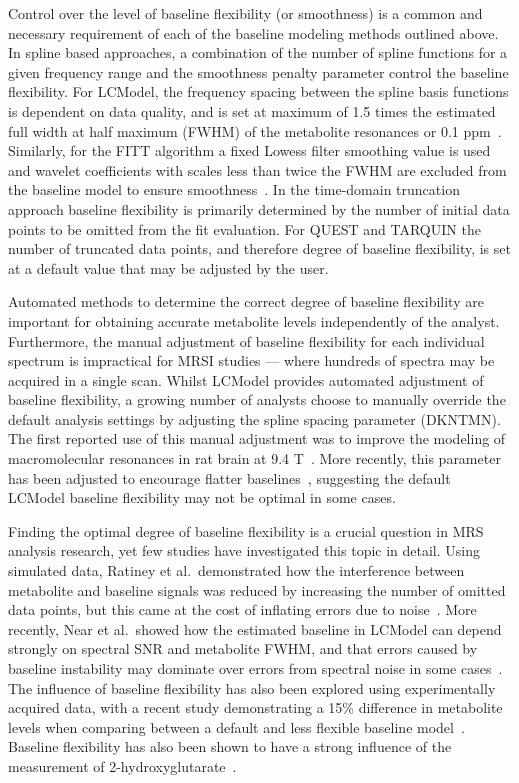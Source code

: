 \documentclass[num-refs]{wiley-article}
\begin{document}
Control over the level of baseline flexibility (or smoothness) is a common and necessary requirement of each of the baseline modeling methods outlined above. In spline based approaches, a combination of the number of spline functions for a given frequency range and the smoothness penalty parameter control the baseline flexibility. For LCModel, the frequency spacing between the spline basis functions is dependent on data quality, and is set at maximum of 1.5 times the estimated full width at half maximum (FWHM) of the metabolite resonances or 0.1 ppm~\cite{Provencher1993}. Similarly, for the FITT algorithm a fixed Lowess filter smoothing value is used and wavelet coefficients with scales less than twice the FWHM are excluded from the baseline model to ensure smoothness~\cite{Young1998}. In the time-domain truncation approach baseline flexibility is primarily determined by the number of initial data points to be omitted from the fit evaluation. For QUEST and TARQUIN the number of truncated data points, and therefore degree of baseline flexibility, is set at a default value that may be adjusted by the user.

Automated methods to determine the correct degree of baseline flexibility are important for obtaining accurate metabolite levels independently of the analyst. Furthermore, the manual adjustment of baseline flexibility for each individual spectrum is impractical for MRSI studies --- where hundreds of spectra may be acquired in a single scan. Whilst LCModel provides automated adjustment of baseline flexibility, a growing number of analysts choose to manually override the default analysis settings by adjusting the spline spacing parameter (DKNTMN). The first reported use of this manual adjustment was to improve the modeling of macromolecular resonances in rat brain at 9.4 T~\cite{Pfeuffer1999}. More recently, this parameter has been adjusted to encourage flatter baselines~\cite{Deelchand2016,Terpstra2010,Marjanska2018}, suggesting the default LCModel baseline flexibility may not be optimal in some cases.

Finding the optimal degree of baseline flexibility is a crucial question in MRS analysis research, yet few studies have investigated this topic in detail. Using simulated data, Ratiney et al.\ demonstrated how the interference between metabolite and baseline signals was reduced by increasing the number of omitted data points, but this came at the cost of inflating errors due to noise~\cite{Ratiney2004}. More recently, Near et al.\ showed how the estimated baseline in LCModel can depend strongly on spectral SNR and metabolite FWHM, and that errors caused by baseline instability may dominate over errors from spectral noise in some cases~\cite{Near2013}. The influence of baseline flexibility has also been explored using experimentally acquired data, with a recent study demonstrating a 15\% difference in metabolite levels when comparing between a default and less flexible baseline model~\cite{Giapitzakis2019}. Baseline flexibility has also been shown to have a strong influence of the measurement of 2-hydroxyglutarate~\cite{Wenger2019}.
\end{document}
